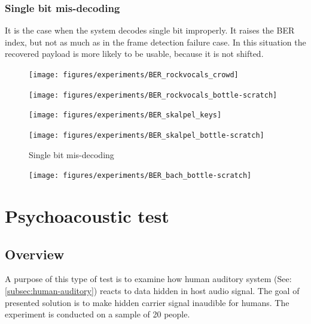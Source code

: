 \documentclass[english,bachelor,a4paper,oneside]{ppfcmthesis}
\begin{document}
\subsubsection{Single bit mis-decoding}
It is the case when the system decodes single bit improperly. It raises the BER index, but not as much as in the frame detection failure case.
In this situation the recovered payload is more likely to be usable, because it is not shifted.
\begin{figure}[!hb]
\begin{minipage}[b]{0.45\textwidth}
  \texttt{[image: figures/experiments/BER\_rockvocals\_crowd]}
\end{minipage}\hfill
\begin{minipage}[b]{0.45\textwidth}
  \texttt{[image: figures/experiments/BER\_rockvocals\_bottle-scratch]}
\end{minipage}
\end{figure}
\begin{figure}[!hb]
\begin{minipage}[b]{0.45\textwidth}
  \texttt{[image: figures/experiments/BER\_skalpel\_keys]}
\end{minipage}\hfill
\begin{minipage}[b]{0.45\textwidth}
  \texttt{[image: figures/experiments/BER\_skalpel\_bottle-scratch]}
\end{minipage}
\label{fig:mis-decoding}
\caption{Single bit mis-decoding}
\end{figure}
\begin{figure}[!hb]
\begin{minipage}[b]{0.45\textwidth}
  \texttt{[image: figures/experiments/BER\_bach\_bottle-scratch]}
\end{minipage}\hfill
\end{figure}

\clearpage

\section{Psychoacoustic test}
\label{sec:psychoacoustic-test}

\subsection{Overview}
A purpose of this type of test is to examine how human auditory system (See: \ref{subsec:human-auditory}) reacts to data hidden
in host audio signal. The goal of presented solution is to make hidden carrier signal inaudible for humans. The experiment is conducted
on a sample of 20 people.
\end{document}
